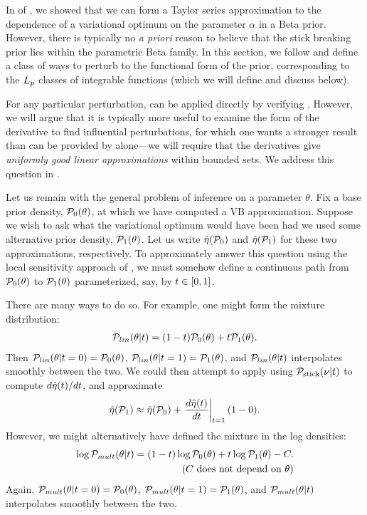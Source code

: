 In  of , we showed that
we can form a Taylor series approximation to the dependence of a variational
optimum on the parameter $\alpha$ in a Beta prior. However, there is typically
no {\em a priori} reason to believe that the stick breaking prior lies within
the parametric Beta family.  In this section, we follow
\citet{gustafson:1996:local} and define a class of ways to perturb to the
functional form of the prior, corresponding to the ${L_{p}}$ classes of
integrable functions (which we will define and discuss below).

For any particular perturbation,  can be applied directly by
verifying .  However, we will argue that it is
typically more useful to examine the form of the derivative to find influential
perturbations, for which one wants a stronger result than can be provided
by  alone---we will require that the derivatives give
{\em uniformly good linear approximations} within bounded sets.
We address this question in .

Let us remain with the general problem of inference on a parameter $\theta$. Fix
a base prior density, $\mathcal{P}_{0}(\theta)$, at which we have computed a VB
approximation.  Suppose we wish to ask what the variational optimum would have
been had we used some alternative prior density, $\mathcal{P}_{1}(\theta)$.  Let us write
$\hat\eta(\mathcal{P}_{0})$ and $\hat\eta(\mathcal{P}_{1})$ for these two approximations,
respectively.  To approximately answer this question using the local sensitivity
approach of , we must somehow define a continuous path
from $\mathcal{P}_{0}(\theta)$ to $\mathcal{P}_{1}(\theta)$ parameterized, say, by $t \in [0, 1]$.

There are many ways to do so.  For example, one might form the mixture
distribution:
%
\begin{align*}
%
\p_{lin}(\theta \vert \t) =
    (1- \t) \pbase(\theta) + \t \palt(\theta).
%
\end{align*}
%
Then $\mathcal{P}_{lin}(\theta \vert t=0) = \mathcal{P}_{0}(\theta)$, $\mathcal{P}_{lin}(\theta \vert t=1) =
\mathcal{P}_{1}(\theta)$, and $\mathcal{P}_{lin}(\theta \vert t)$ interpolates smoothly between the
two.  We could then attempt to apply  using $\mathcal{P}_{\mathrm{stick}}(\nu \vert
t)$ to compute $d\hat\eta(t) / dt$, and approximate
%
\begin{align*}
%
\etaopt(\palt) \approx \etaopt(\pbase) + \fracat{d \etaopt(\t)}{d\t}{\t=1}(1 - 0).
%
\end{align*}
%
However, we might alternatively have defined the mixture in the log densities:
%
\begin{align*}
%
\log \p_{mult}(\theta \vert \t) =
    (1- \t) \log\pbase(\theta) + \t \log\palt(\theta) -
    \const. \\ \constdesc{\theta}
%
\end{align*}
%
Again, $\mathcal{P}_{mult}(\theta \vert t=0) = \mathcal{P}_{0}(\theta)$, $\mathcal{P}_{mult}(\theta \vert
t=1) = \mathcal{P}_{1}(\theta)$, and $\mathcal{P}_{mult}(\theta \vert t)$ interpolates smoothly
between the two.

